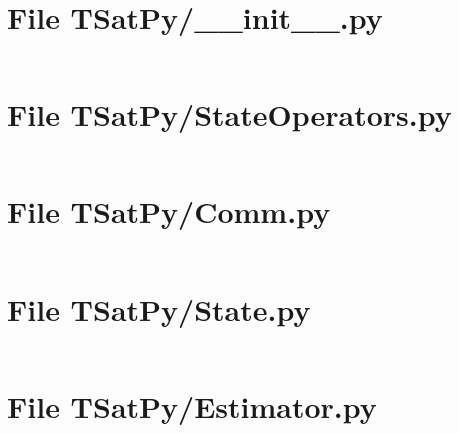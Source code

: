 


\linespread{1}


\section{File TSatPy/\_\_init\_\_.py}\label{code:TSatPy/__init__.py}
\inputminted[linenos,fontsize=\scriptsize]{python}{/home/dcouture/git/mathyourlife/TSatPy/TSatPy/__init__.py}

\section{File TSatPy/StateOperators.py}\label{code:TSatPy/StateOperators.py}
\inputminted[linenos,fontsize=\scriptsize]{python}{/home/dcouture/git/mathyourlife/TSatPy/TSatPy/StateOperators.py}

\section{File TSatPy/Comm.py}\label{code:TSatPy/Comm.py}
\inputminted[linenos,fontsize=\scriptsize]{python}{/home/dcouture/git/mathyourlife/TSatPy/TSatPy/Comm.py}

\section{File TSatPy/State.py}\label{code:TSatPy/State.py}
\inputminted[linenos,fontsize=\scriptsize]{python}{/home/dcouture/git/mathyourlife/TSatPy/TSatPy/State.py}

\section{File TSatPy/Estimator.py}\label{code:TSatPy/Estimator.py}
\inputminted[linenos,fontsize=\scriptsize]{python}{/home/dcouture/git/mathyourlife/TSatPy/TSatPy/Estimator.py}

